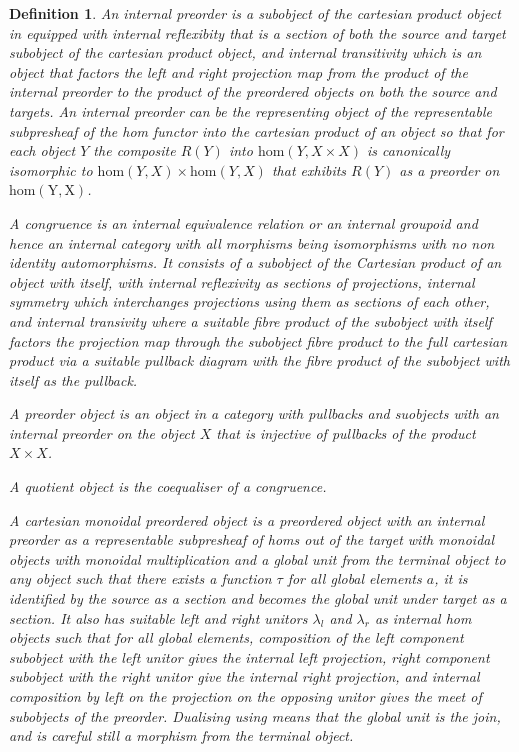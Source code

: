 \documentclass{tufte-book}
\newtheorem{definition}[theorem]{Definition}
\begin{document}
 \begin{definition}
     An internal preorder is a subobject of the cartesian product object in equipped with internal reflexibity that is a section of both the source and target subobject of the cartesian product object, and internal transitivity which is an object that factors the left and right projection map from the product of the internal preorder to the product of the preordered objects on both the source and targets. An internal preorder can be the representing object of the representable subpresheaf of the hom functor into the cartesian product of an object so that for each object $Y$ the composite $R(Y)$ into $\mathrm{hom}(Y, X \times X)$ is canonically isomorphic to $\mathrm{hom}(Y,X) \times \mathrm{hom}(Y,X)$ that exhibits $R(Y)$ as a preorder on $\mathrm{hom(Y,X)}$.
 
     A congruence is an internal equivalence relation or an internal groupoid and hence an internal category with all morphisms being isomorphisms with no non identity automorphisms. It consists of a subobject of the Cartesian product of an object with itself, with internal reflexivity as sections of projections, internal symmetry which interchanges projections using them as sections of each other, and internal transivity where a suitable fibre product of the subobject with itself factors the projection map through the subobject fibre product to the full cartesian product via a suitable pullback diagram with the fibre product of the subobject with itself as the pullback.
 
     A preorder object is an object in a category with pullbacks and suobjects with an internal preorder on the object $X$ that is injective  of pullbacks of the product $X \times X$.
 
     A quotient object is the coequaliser of a congruence.
 
     A cartesian monoidal preordered object is a preordered object with an internal preorder as a representable subpresheaf of homs out of the target with monoidal objects with monoidal multiplication and a global unit from the terminal object to any object such that there exists a function $\tau$ for all global elements $a$, it is identified by the source as a section and becomes the global unit under target as a section. It also has suitable left and right unitors $\lambda_l$ and $\lambda_r$ as internal hom objects such that for all global elements, composition of the left component subobject with the left unitor gives the internal left projection, right component subobject with the right unitor give the internal right projection, and internal composition by left on the projection on the opposing unitor gives the meet of subobjects of the preorder. Dualising using means that the global unit is the join, and is careful still a morphism from the terminal object.
 

\end{definition}
\end{document}
